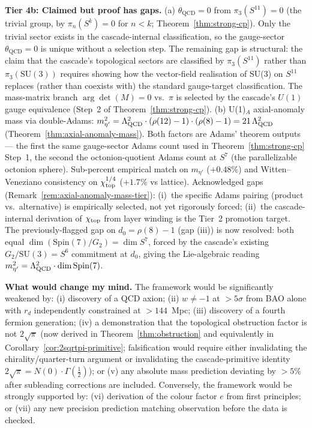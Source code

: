 \documentclass[12pt,a4paper]{article}
\begin{document}
\textbf{Tier 4b: Claimed but proof has gaps.} (a) $\theta_{\text{QCD}} = 0$ from $\pi_3(S^{11}) = 0$ (the trivial group, by $\pi_n(S^k) = 0$ for $n < k$; Theorem~\ref{thm:strong-cp}). Only the trivial sector exists in the cascade-internal classification, so the gauge-sector $\theta_{\text{QCD}} = 0$ is unique without a selection step. The remaining gap is structural: the claim that the cascade's topological sectors are classified by $\pi_3(S^{11})$ rather than $\pi_3(\text{SU}(3))$ requires showing how the vector-field realisation of SU(3) on $S^{11}$ replaces (rather than coexists with) the standard gauge-target classification. The mass-matrix branch $\arg\det(M) = 0$ vs.\ $\pi$ is selected by the cascade's $U(1)$ gauge equivalence (Step~2 of Theorem~\ref{thm:strong-cp}). (b) U(1)$_A$ axial-anomaly mass via double-Adams: $m_{\eta'}^2 = \Lambda_{\rm QCD}^2\cdot(\rho(12)-1)\cdot(\rho(8)-1) = 21\,\Lambda_{\rm QCD}^2$ (Theorem~\ref{thm:axial-anomaly-mass}). Both factors are Adams' theorem outputs --- the first the same gauge-sector Adams count used in Theorem~\ref{thm:strong-cp} Step~1, the second the octonion-quotient Adams count at $S^7$ (the parallelizable octonion sphere). Sub-percent empirical match on $m_{\eta'}$ ($+0.48\%$) and Witten--Veneziano consistency on $\chi_{\rm top}^{1/4}$ ($+1.7\%$ vs lattice). Acknowledged gaps (Remark~\ref{rem:axial-anomaly-mass-tier}): (i)~the specific Adams pairing (product vs.\ alternative) is empirically selected, not yet rigorously forced; (ii)~the cascade-internal derivation of $\chi_{\rm top}$ from layer winding is the Tier~2 promotion target. The previously-flagged gap on $d_0 = \rho(8)-1$ (gap (iii)) is now resolved: both equal $\dim(\mathrm{Spin}(7)/G_2) = \dim S^7$, forced by the cascade's existing $G_2/\mathrm{SU}(3) = S^6$ commitment at $d_0$, giving the Lie-algebraic reading $m_{\eta'}^2 = \Lambda_{\rm QCD}^2\cdot\dim\mathrm{Spin}(7)$.

\textbf{What would change my mind.} The framework would be significantly weakened by: (i) discovery of a QCD axion; (ii) $w \neq -1$ at $> 5\sigma$ from BAO alone with $r_d$ independently constrained at $> 144$~Mpc; (iii) discovery of a fourth fermion generation; (iv) a demonstration that the topological obstruction factor is not $2\sqrt{\pi}$ (now derived in Theorem~\ref{thm:obstruction} and equivalently in Corollary~\ref{cor:2sqrtpi-primitive}; falsification would require either invalidating the chirality/quarter-turn argument or invalidating the cascade-primitive identity $2\sqrt{\pi} = N(0)\cdot\Gamma(\tfrac{1}{2})$); or (v) any absolute mass prediction deviating by $> 5\%$ after subleading corrections are included. Conversely, the framework would be strongly supported by: (vi) derivation of the colour factor $e$ from first principles; or (vii) any new precision prediction matching observation before the data is checked.
\end{document}
